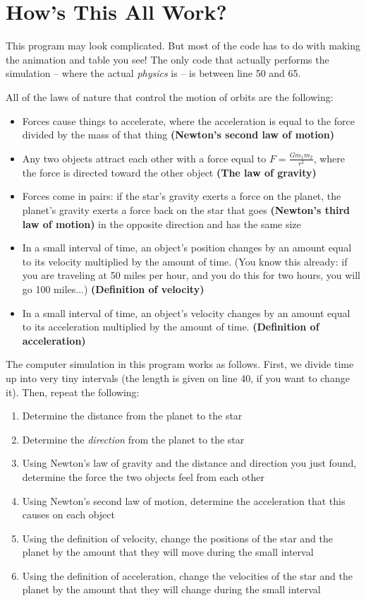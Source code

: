 \documentclass[11pt]{article}
\begin{document}
\section{How's This All Work?}

This program may look complicated. But most of the code has to do with making the animation and table you see! The only code that actually performs the simulation -- where the actual {\it physics} is -- is between line 50 and 65.

All of the laws of nature that control the motion of orbits are the following:

\begin{itemize}
	\item Forces cause things to accelerate, where the acceleration is equal to the force divided by the mass of that thing {\bf (Newton's second law of motion)}
	\item Any two objects attract each other with a force equal to $F=\frac{Gm_1m_2}{r^2}$, where the force is directed toward the other object {\bf (The law of gravity)}
	\item Forces come in pairs: if the star's gravity exerts a force on the planet, the planet's gravity exerts a force back on the star that goes {\bf (Newton's third law of motion)} in the opposite direction and has the same size
	\item In a small interval of time, an object's position changes by an amount equal to its velocity multiplied by the amount of time. (You know this already: if you are traveling at 50 miles per hour, and you do this for two hours, you will go 100 miles...) {\bf (Definition of velocity)}
	\item In a small interval of time, an object's velocity changes by an amount equal to its acceleration multiplied by the amount of time. {\bf (Definition of acceleration)}
\end{itemize}
\newpage

The computer simulation in this program works as follows. First, we divide time up into very tiny intervals (the length is given on line 40, if you want to change it). Then, repeat the following:

\begin{enumerate}
	\item Determine the distance from the planet to the star
	\item Determine the {\it direction} from the planet to the star
	\item Using Newton's law of gravity and the distance and direction you just found, determine the force the two objects feel from each other
	\item Using Newton's second law of motion, determine the acceleration that this causes on each object
	\item Using the definition of velocity, change the positions of the star and the planet by the amount that they will move during the small interval
	\item Using the definition of acceleration, change the velocities of the star and the planet by the amount that they will change during the small interval
\end{enumerate}
\end{document}
